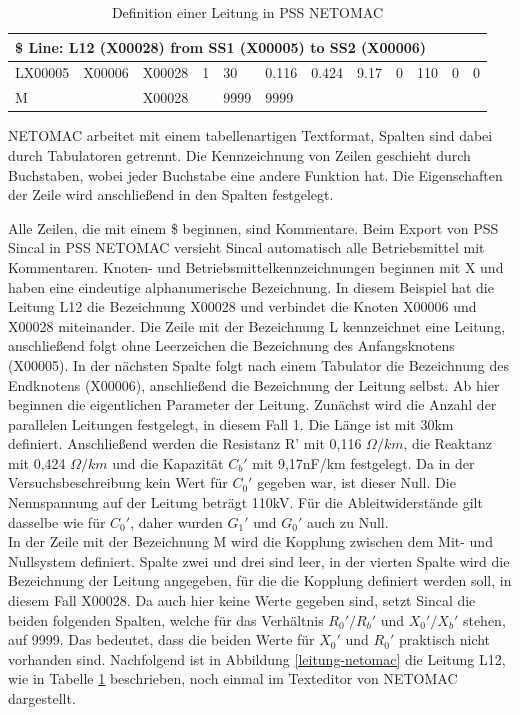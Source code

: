 \documentclass{scrartcl}
\begin{document}
\begin{onehalfspace}
\begin{table}[H]
\begin{tabular}{|l|l|l|l|l|l|l|l|l|l|l|l|}
\hline 
\multicolumn{12}{|l|}{\$ Line: L12 (X00028) from SS1 (X00005) to SS2 (X00006)} \\ 
\hline 
LX00005 & X00006  & X00028 & 1 & 30 & 0.116 & 0.424 & 9.17 & 0 & 110 & 0 &0 \\ 
\hline 
M & & X00028 & & 9999 & 9999 & & & & & & \\ 
\hline 
\end{tabular} 
\caption{Definition einer Leitung in PSS NETOMAC}
\label{leitung-netomac-tb}
\end{table}

NETOMAC arbeitet mit einem tabellenartigen Textformat, Spalten sind dabei durch Tabulatoren getrennt. Die Kennzeichnung von Zeilen geschieht durch Buchstaben, wobei jeder Buchstabe eine andere Funktion hat. Die Eigenschaften der Zeile wird anschließend in den Spalten festgelegt.

Alle Zeilen, die mit einem \$ beginnen, sind Kommentare. Beim Export von PSS Sincal in PSS NETOMAC versieht Sincal automatisch alle Betriebsmittel mit Kommentaren. Knoten- und Betriebsmittelkennzeichnungen beginnen mit X und haben eine eindeutige alphanumerische Bezeichnung. In diesem Beispiel hat die Leitung L12 die Bezeichnung X00028 und verbindet die Knoten X00006 und X00028 miteinander. Die Zeile mit der Bezeichnung L kennzeichnet eine Leitung, anschließend folgt ohne Leerzeichen die Bezeichnung des Anfangsknotens (X00005). In der nächsten Spalte folgt nach einem Tabulator die Bezeichnung des Endknotens (X00006), anschließend die Bezeichnung der Leitung selbst. Ab hier beginnen die eigentlichen Parameter der Leitung. Zunächst wird die Anzahl der parallelen Leitungen festgelegt, in diesem Fall 1. Die Länge ist mit 30km definiert. Anschließend werden die Resistanz R' mit 0,116 $\Omega /km$, die Reaktanz mit 0,424 $\Omega /km$ und die Kapazität $C_b'$ mit 9,17nF/km festgelegt. Da in der Versuchsbeschreibung kein Wert für $C_0'$ gegeben war, ist dieser Null. Die Nennspannung auf der Leitung beträgt 110kV. Für die Ableitwiderstände gilt dasselbe wie für $C_0'$, daher wurden $G_1'$ und $G_0'$ auch zu Null.\\
In der Zeile mit der Bezeichnung M wird die Kopplung zwischen dem Mit- und Nullsystem definiert. Spalte zwei und drei sind leer, in der vierten Spalte wird die Bezeichnung der Leitung angegeben, für die die Kopplung definiert werden soll, in diesem Fall X00028. Da auch hier keine Werte gegeben sind, setzt Sincal die beiden folgenden Spalten, welche für das Verhältnis $R_0'/R_b'$ und $X_0'/X_b'$ stehen, auf 9999. Das bedeutet, dass die beiden Werte für $X_0'$ und $R_0'$ praktisch nicht vorhanden sind. Nachfolgend ist in Abbildung \ref{leitung-netomac} die Leitung L12, wie in Tabelle \ref{leitung-netomac-tb} beschrieben, noch einmal im Texteditor von NETOMAC dargestellt.


\end{onehalfspace}
\end{document}
